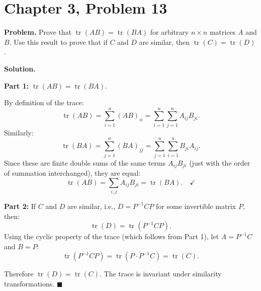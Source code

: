 \documentclass[12pt]{article}
\begin{document}
\section*{Chapter 3, Problem 13}

\textbf{Problem.} Prove that $\operatorname{tr}(AB) = \operatorname{tr}(BA)$ for arbitrary $n \times n$ matrices $A$ and $B$. Use this result to prove that if $C$ and $D$ are similar, then $\operatorname{tr}(C) = \operatorname{tr}(D)$.

\bigskip
\textbf{Solution.}

\textbf{Part 1:} $\operatorname{tr}(AB) = \operatorname{tr}(BA)$.

By definition of the trace:
\[
\operatorname{tr}(AB) = \sum_{i=1}^{n} (AB)_{ii} = \sum_{i=1}^{n} \sum_{j=1}^{n} A_{ij} B_{ji}.
\]
Similarly:
\[
\operatorname{tr}(BA) = \sum_{j=1}^{n} (BA)_{jj} = \sum_{j=1}^{n} \sum_{i=1}^{n} B_{ji} A_{ij}.
\]
Since these are finite double sums of the same terms $A_{ij}B_{ji}$ (just with the order of summation interchanged), they are equal:
\[
\operatorname{tr}(AB) = \sum_{i,j} A_{ij}B_{ji} = \operatorname{tr}(BA). \quad \checkmark
\]

\medskip
\textbf{Part 2:} If $C$ and $D$ are similar, i.e., $D = P^{-1}CP$ for some invertible matrix $P$, then:
\[
\operatorname{tr}(D) = \operatorname{tr}(P^{-1}CP).
\]
Using the cyclic property of the trace (which follows from Part 1), let $A = P^{-1}C$ and $B = P$:
\[
\operatorname{tr}(P^{-1}CP) = \operatorname{tr}(P \cdot P^{-1}C) = \operatorname{tr}(C).
\]

Therefore $\operatorname{tr}(D) = \operatorname{tr}(C)$. The trace is invariant under similarity transformations. \hfill $\blacksquare$
\end{document}
